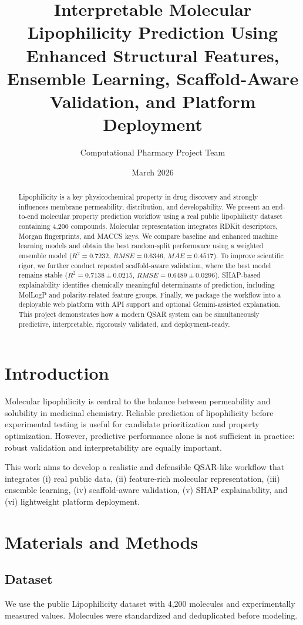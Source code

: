 \documentclass[11pt,a4paper]{article}
\title{\textbf{Interpretable Molecular Lipophilicity Prediction Using Enhanced Structural Features, Ensemble Learning, Scaffold-Aware Validation, and Platform Deployment}}
\author{Computational Pharmacy Project Team}
\date{March 2026}
\begin{document}
\maketitle
\begin{abstract}
Lipophilicity is a key physicochemical property in drug discovery and strongly influences membrane permeability, distribution, and developability. We present an end-to-end molecular property prediction workflow using a real public lipophilicity dataset containing 4,200 compounds. Molecular representation integrates RDKit descriptors, Morgan fingerprints, and MACCS keys. We compare baseline and enhanced machine learning models and obtain the best random-split performance using a weighted ensemble model ($R^2 = 0.7232$, $RMSE = 0.6346$, $MAE = 0.4517$). To improve scientific rigor, we further conduct repeated scaffold-aware validation, where the best model remains stable ($R^2 = 0.7138 \pm 0.0215$, $RMSE = 0.6489 \pm 0.0296$). SHAP-based explainability identifies chemically meaningful determinants of prediction, including MolLogP and polarity-related feature groups. Finally, we package the workflow into a deployable web platform with API support and optional Gemini-assisted explanation. This project demonstrates how a modern QSAR system can be simultaneously predictive, interpretable, rigorously validated, and deployment-ready.
\end{abstract}

\section{Introduction}
Molecular lipophilicity is central to the balance between permeability and solubility in medicinal chemistry. Reliable prediction of lipophilicity before experimental testing is useful for candidate prioritization and property optimization. However, predictive performance alone is not sufficient in practice: robust validation and interpretability are equally important.

This work aims to develop a realistic and defensible QSAR-like workflow that integrates (i) real public data, (ii) feature-rich molecular representation, (iii) ensemble learning, (iv) scaffold-aware validation, (v) SHAP explainability, and (vi) lightweight platform deployment.

\section{Materials and Methods}
\subsection{Dataset}
We use the public Lipophilicity dataset with 4,200 molecules and experimentally measured values. Molecules were standardized and deduplicated before modeling.
\end{document}
